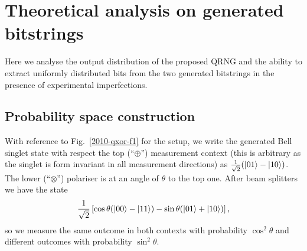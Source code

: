 \documentclass{mscs}
\def\ket#1{\mathinner{|{#1}\rangle}}
\begin{document}
\section{Theoretical analysis on generated bitstrings}

Here we analyse the output distribution of the proposed QRNG and the ability to extract uniformly distributed bits from the two generated bitstrings in the presence of experimental imperfections.

\subsection{Probability space construction}

With reference to Fig.~\ref{2010-qxor-f1} for the setup,
we write the generated Bell singlet state with respect the top (``$\oplus$'') measurement context
(this is arbitrary as the singlet is form invariant in all measurement directions) as
$\frac{1}{\sqrt{2}}(\ket{01} - \ket{10})$.
 The lower (``$\otimes$'') polariser is at an angle of $\theta$ to the top one. After beam splitters we have the state
$$\frac{1}{\sqrt{2}}\left[\cos \theta(\ket{00}-\ket{11}) - \sin \theta (\ket{01} + \ket{10})\right],$$
 so we measure the same outcome in both contexts with probability $\cos^2\theta$ and different outcomes with probability $\sin^2\theta$.
\end{document}
